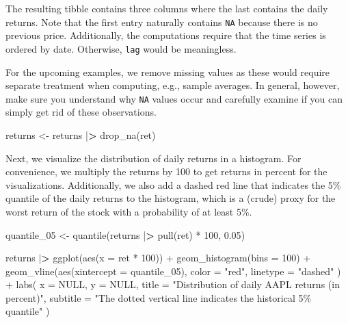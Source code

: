 \documentclass[
]{krantz}
\newenvironment{Shaded}{\begin{snugshade}}{\end{snugshade}}
\newcommand{\AttributeTok}[1]{\textcolor[rgb]{0.61,0.61,0.61}{#1}}
\newcommand{\ConstantTok}[1]{\textcolor[rgb]{0,0,0}{#1}}
\newcommand{\DecValTok}[1]{\textcolor[rgb]{0.06,0.06,0.06}{#1}}
\newcommand{\ErrorTok}[1]{\textcolor[rgb]{0.14,0.14,0.14}{\textbf{#1}}}
\newcommand{\FloatTok}[1]{\textcolor[rgb]{0.06,0.06,0.06}{#1}}
\newcommand{\FunctionTok}[1]{\textcolor[rgb]{0,0,0}{#1}}
\newcommand{\NormalTok}[1]{#1}
\newcommand{\OtherTok}[1]{\textcolor[rgb]{0.37,0.37,0.37}{#1}}
\newcommand{\SpecialCharTok}[1]{\textcolor[rgb]{0,0,0}{#1}}
\newcommand{\StringTok}[1]{\textcolor[rgb]{0.5,0.5,0.5}{#1}}
\begin{document}
The resulting tibble contains three columns where the last contains the daily returns. Note that the first entry naturally contains \texttt{NA} because there is no previous price. Additionally, the computations require that the time series is ordered by date.
Otherwise, \texttt{lag} would be meaningless.

For the upcoming examples, we remove missing values as these would require separate treatment when computing, e.g., sample averages. In general, however, make sure you understand why \texttt{NA} values occur and carefully examine if you can simply get rid of these observations.

\begin{Shaded}
\begin{Highlighting}[]
\NormalTok{returns }\OtherTok{\textless{}{-}}\NormalTok{ returns }\SpecialCharTok{|}\ErrorTok{\textgreater{}}
  \FunctionTok{drop\_na}\NormalTok{(ret)}
\end{Highlighting}
\end{Shaded}

Next, we visualize the distribution of daily returns in a histogram. For convenience, we multiply the returns by 100 to get returns in percent for the visualizations. Additionally, we also add a dashed red line that indicates the 5\% quantile of the daily returns to the histogram, which is a (crude) proxy for the worst return of the stock with a probability of at least 5\%.

\begin{Shaded}
\begin{Highlighting}[]
\NormalTok{quantile\_05 }\OtherTok{\textless{}{-}} \FunctionTok{quantile}\NormalTok{(returns }\SpecialCharTok{|}\ErrorTok{\textgreater{}} \FunctionTok{pull}\NormalTok{(ret) }\SpecialCharTok{*} \DecValTok{100}\NormalTok{, }\FloatTok{0.05}\NormalTok{)}

\NormalTok{returns }\SpecialCharTok{|}\ErrorTok{\textgreater{}}
  \FunctionTok{ggplot}\NormalTok{(}\FunctionTok{aes}\NormalTok{(}\AttributeTok{x =}\NormalTok{ ret }\SpecialCharTok{*} \DecValTok{100}\NormalTok{)) }\SpecialCharTok{+}
  \FunctionTok{geom\_histogram}\NormalTok{(}\AttributeTok{bins =} \DecValTok{100}\NormalTok{) }\SpecialCharTok{+}
  \FunctionTok{geom\_vline}\NormalTok{(}\FunctionTok{aes}\NormalTok{(}\AttributeTok{xintercept =}\NormalTok{ quantile\_05),}
    \AttributeTok{color =} \StringTok{"red"}\NormalTok{,}
    \AttributeTok{linetype =} \StringTok{"dashed"}
\NormalTok{  ) }\SpecialCharTok{+}
  \FunctionTok{labs}\NormalTok{(}
    \AttributeTok{x =} \ConstantTok{NULL}\NormalTok{,}
    \AttributeTok{y =} \ConstantTok{NULL}\NormalTok{,}
    \AttributeTok{title =} \StringTok{"Distribution of daily AAPL returns (in percent)"}\NormalTok{,}
    \AttributeTok{subtitle =} \StringTok{"The dotted vertical line indicates the historical 5\% quantile"}
\NormalTok{  )}
\end{Highlighting}
\end{Shaded}
\end{document}
